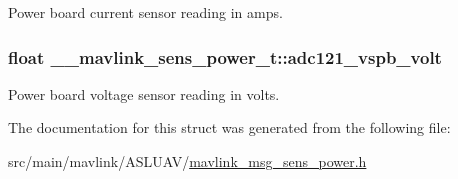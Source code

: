 Power board current sensor reading in amps. 

\hypertarget{struct____mavlink__sens__power__t_afd4bfbfe51559f8b690acd07230aa1ab}{
\subsubsection[{adc121\+\_\+vspb\+\_\+volt}]{\setlength{\rightskip}{0pt plus 5cm}float \+\_\+\+\_\+mavlink\+\_\+sens\+\_\+power\+\_\+t\+::adc121\+\_\+vspb\+\_\+volt}}\label{struct____mavlink__sens__power__t_afd4bfbfe51559f8b690acd07230aa1ab}


Power board voltage sensor reading in volts. 



The documentation for this struct was generated from the following file\+:\begin{DoxyCompactItemize}
\item 
src/main/mavlink/\+A\+S\+L\+U\+A\+V/\hyperlink{mavlink__msg__sens__power_8h}{mavlink\+\_\+msg\+\_\+sens\+\_\+power.\+h}\end{DoxyCompactItemize}
